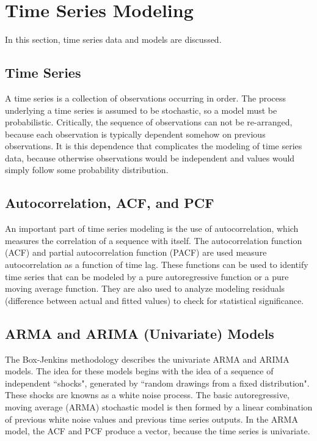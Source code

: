 \documentclass[a4paper]{scrartcl}
\begin{document}
\section*{Time Series Modeling}
\label{sec:time_series_modeling}
In this section, time series data and models are discussed.

\subsection*{Time Series}
A time series is a collection of observations occurring in order. The process underlying a time series is assumed to be stochastic, so a model must be probabilistic. Critically, the sequence of observations can not be re-arranged, because each observation is typically dependent somehow on previous observations. It is this dependence that complicates the modeling of time series data, because otherwise observations would be independent and values would simply follow some probability distribution. 

\subsection*{Autocorrelation, ACF, and PCF}
An important part of time series modeling is the use of autocorrelation, which measures the correlation of a sequence with itself. The autocorrelation function (ACF) and partial autocorrelation function (PACF) are used measure autocorrelation as a function of time lag. These functions can be used to identify time series that can be modeled by a pure autoregressive function or a pure moving average function. They are also used to analyze modeling residuals (difference between actual and fitted values) to check for statistical significance. 

\subsection*{ARMA and ARIMA (Univariate) Models}
The Box-Jenkins methodology describes the univariate ARMA and ARIMA models. The idea for these models begins with the idea of a sequence of independent ``shocks", generated by ``random drawings from a fixed distribution"\cite{box_jenkins_reinsel_2008}. These shocks are knowns as a white noise process. The basic autoregressive, moving average (ARMA) stochastic model is then formed by a linear combination of previous white noise values and previous time series outputs. In the ARMA model, the ACF and PCF produce a vector, because the time series is univariate.
\end{document}
